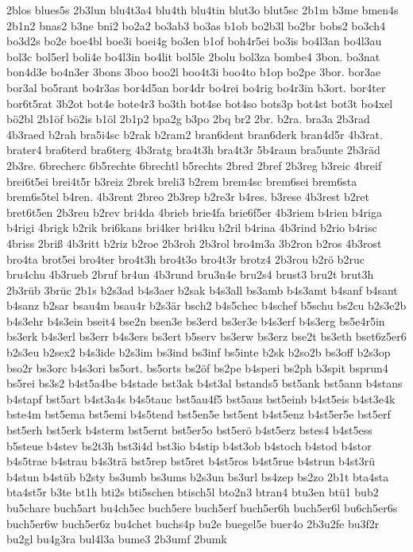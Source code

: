 {2blos
blues5s
2b3lun
blu4t3a4
blu4th
blu4tin
blut3o
blut5sc
2b1m
b3me
bmen4s
2b1n2
bnas2
b3ne
bni2
bo2a2
bo3ab3
bo3as
b1ob
bo2b3l
bo2br
bobs2
bo3ch4
bo3d2s
bo2e
boe4bl
boe3i
boei4g
bo3en
b1of
boh4r5ei
bo3is
bo4l3an
bo4l3au
bol3c
bol5erl
boli4e
bo4l3in
bo4lit
bol5le
2bolu
bol3za
bombe4
3bon.
bo3nat
bon4d3e
bo4n3er
3bons
3boo
boo2l
boo4t3i
boo4to
b1op
bo2pe
3bor.
bor3ae
bor3al
bo5rant
bo4r3as
bor4d5an
bor4dr
bo4rei
bo4rig
bo4r3in
b3ort.
bor4ter
bor6t5rat
3b2ot
bot4e
bote4r3
bo3th
bot4se
bot4so
bots3p
bot4st
bot3t
bo4xel
bö2bl
2b1öf
bö2is
b1öl
2b1p2
bpa2g
b3po
2bq
br2
2br.
b2ra.
bra3a
2b3rad
4b3raed
b2rah
bra5i4sc
b2rak
b2ram2
bran6dent
bran6derk
bran4d5r
4b3rat.
brater4
bra6terd
bra6terg
4b3ratg
bra4t3h
bra4t3r
5b4raun
bra5unte
2b3räd
2b3re.
6brecherc
6b5rechte
6brechtl
b5rechts
2bred
2bref
2b3reg
b3reic
4breif
brei6t5ei
brei4t5r
b3reiz
2brek
breli3
b2rem
brem4sc
brem6sei
brem6sta
brem6s5tel
b4ren.
4b3rent
2breo
2b3rep
b2re3r
b4res.
b3rese
4b3rest
b2ret
bret6t5en
2b3reu
b2rev
bri4da
4brieb
brie4fa
brie6f5er
4b3riem
b4rien
b4riga
b4rigi
4brigk
b2rik
bri6kans
bri4ker
bri4ku
b2ril
b4rina
4b3rind
b2rio
b4risc
4briss
2briß
4b3ritt
b2riz
b2roe
2b3roh
2b3rol
bro4m3a
3b2ron
b2ros
4b3rost
bro4ta
brot5ei
bro4ter
bro4t3h
bro4t3o
bro4t3r
brotz4
2b3rou
b2rö
b2ruc
bru4chu
4b3rueb
2bruf
br4un
4b3rund
bru3n4e
bru2s4
brust3
bru2t
brut3h
2b3rüb
3brüc
2b1s
b2s3ad
b4s3aer
b2sak
b4s3all
bs3amb
b4s3amt
b4sanf
b4sant
b4sanz
b2sar
bsau4m
bsau4r
b2s3är
bsch2
b4s5chec
b4schef
b5schu
bs2cu
b2s3e2b
b4s3ehr
b4s3ein
bseit4
bse2n
bsen3e
bs3erd
bs3er3e
b4s3erf
b4s3erg
bs5e4r5in
bs3erk
b4s3erl
bs3err
b4s3ers
bs3ert
b5serv
bs3erw
bs3erz
bse2t
bs3eth
bset6z5er6
b2s3eu
b2sex2
b4s3ide
b2s3im
bs3ind
bs3inf
bs5inte
b2sk
b2so2b
bs3off
b2s3op
bso2r
bs3orc
b4s3ori
bs5ort.
bs5orts
bs2öf
bs2pe
b4speri
bs2ph
b3spit
bsprun4
bs5rei
bs3s2
b4st5a4be
b4stade
bst3ak
b4st3al
bstands5
bst5ank
bst5ann
b4stans
b4stapf
bst5art
b4st3a4s
b4s5tauc
bst5au4f5
bst5aus
bst5einb
b4st5eis
b4st3e4k
bste4m
bst5ema
bst5emi
b4s5tend
bst5en5e
bst5ent
b4st5enz
b4st5er5e
bst5erf
bst5erh
bst5erk
b4sterm
bst5ernt
bst5er5o
bst5erö
b4st5erz
bstes4
b4st5ess
b5steue
b4stev
bs2t3h
bst3i4d
bst3io
b4stip
b4st3ob
b4stoch
b4stod
b4stor
b4s5trae
b4strau
b4s3trä
bst5rep
bst5ret
b4st5ros
b4st5rue
b4strun
b4st3rü
b4stun
b4stüb
b2sty
bs3umb
bs3ums
b2s3un
bs3url
bs4zep
bs2zo
2b1t
bta4sta
bta4st5r
b3te
bt1h
bti2s
bti5schen
btisch5l
bto2n3
btran4
btu3en
btü1
bub2
bu5chare
buch5art
bu4ch5ec
buch5ere
buch5erf
buch5er6h
buch5er6l
bu6ch5er6s
buch5er6w
buch5er6z
bu4chet
buchs4p
bu2e
buegel5e
buer4o
2b3u2fe
bu3f2r
bu2gl
bu4g3ra
bul4l3a
bume3
2b3umf
2bumk
}

